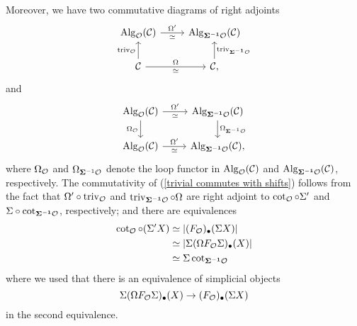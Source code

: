 Moreover, 
we have two commutative diagrams of right adjoints
\begin{equation}
    \label{trivial commutes with shifts}
    \begin{tikzcd}
	\Alg_{\CO}(\CC)    & \Alg_{\bf{\Sigma}^{-1} \CO }(\CC) \\
	 \CC & \CC
	\arrow[from=1-1, to = 1-2, "\Omega'", "\simeq" below]
	\arrow[from=2-1 , to =1-1, "\trivial_{\CO}" left]
	\arrow[from=2-2 , to =1-2,  "\trivial_{\bf{\Sigma}^{-1} \CO }" right]
	\arrow[from=2-1, to=2-2, "\Omega", "\simeq" below],
\end{tikzcd}
\end{equation}
and 
\begin{equation}
    \label{diagram of equivalences in shifting}
    \begin{tikzcd}
	\Alg_{\CO}(\CC)    & \Alg_{\bf{\Sigma}^{-1} \CO }(\CC) \\
	 \Alg_{\CO}(\CC) & \Alg_{\bf{\Sigma}^{-1} \CO }(\CC)
	\arrow[from=1-1, to = 1-2, "\Omega'", "\simeq" below]
	\arrow[from=1-1 , to =2-1, "\Omega_{\CO}" left]
	\arrow[from=1-2 , to =2-2, "\Omega_{\mathbf{\Sigma}^{-1} \CO}" right]
	\arrow[from=2-1, to=2-2, "\Omega'", "\simeq" below],
\end{tikzcd}
\end{equation}
where $\Omega_{{\mathcal{O}}}$ and $\Omega_{\mathbf{\Sigma}^{-1} {\mathcal{O}}}$ denote the loop functor in $\operatorname{Alg}_{{\mathcal{O}}}({\mathcal{C}})$ and $\operatorname{Alg}_{\bf{\Sigma}^{-1} {\mathcal{O}} }({\mathcal{C}}) $, respectively.
The commutativity of (\ref{trivial commutes with shifts}) follows from the fact that $\Omega' \circ \operatorname{triv}_{{\mathcal{O}}}$ and $\operatorname{triv}_{\bf{\Sigma}^{-1} {\mathcal{O}} }\circ \Omega$ are right adjoint to $ \cot_{{\mathcal{O}}}\circ \Sigma'$ and $\Sigma \circ \cot_{\bf{\Sigma}^{-1} {\mathcal{O}}}$, respectively; and there are equivalences
\begin{align*}
    \cot_{{\mathcal{O}}}\circ (\Sigma' X) & \simeq |(F_{{\mathcal{O}}})_{\bullet} (\Sigma X)|\\
    & \simeq |\Sigma (\Omega F_{{\mathcal{O}}}\Sigma)_{\bullet} (X) |\\
    & \simeq \Sigma \cot_{\bf{\Sigma}^{-1} {\mathcal{O}}}
\end{align*}
where we used that there is an equivalence of simplicial objects
$$
\Sigma (\Omega F_{{\mathcal{O}}}\Sigma)_{\bullet} (X)
\to
(F_{{\mathcal{O}}})_{\bullet} (\Sigma X) 
$$
in the second equivalence.

